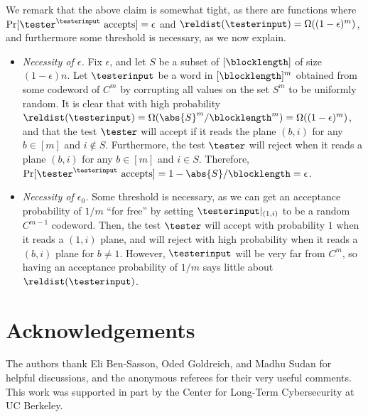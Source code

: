 \documentclass{toc}
\theoremstyle{plain}
\begin{document}
We remark that the above claim is somewhat tight, as there are functions where ${\Pr[\tester^{\testerinput} \text{ accepts}] = \epsilon}$ and $\reldist(\testerinput) = \Omega((1- \epsilon)^m)$, and furthermore some threshold is necessary, as we now explain.
\begin{itemize}

  \item \emph{Necessity of $\epsilon$.}
  Fix $\epsilon$, and let $S$ be a subset of $[\blocklength]$ of size $(1-\epsilon) n$. Let $\testerinput$ be a word in $[\blocklength]^m$ obtained from some codeword of $C^m$ by corrupting all values on the set $S^{m}$ to be uniformly random. It is clear that with high probability $\reldist(\testerinput) = \Omega(\abs{S}^m/\blocklength^m) = \Omega((1- \epsilon)^m)$, and that the test $\tester$ will accept if it reads the plane $(b, i)$ for any $b \in [m]$ and $i \notin S$. Furthermore, the test $\tester$ will reject when it reads a plane $(b,i)$ for any $b \in [m]$ and $i \in S$. Therefore, $\Pr[\tester^{\testerinput} \text{ accepts}] = 1 - \abs{S}/\blocklength = \epsilon$.

  \item \emph{Necessity of $\epsilon_0$.}
Some threshold is necessary, as we can get an acceptance probability of $1/m$ ``for free'' by setting $\testerinput |_{(1,i)}$ to be a random $C^{m-1}$ codeword. Then, the test $\tester$ will accept with probability $1$ when it reads a $(1,i)$ plane, and will reject with high probability when it reads a $(b,i)$ plane for $b \ne 1$. However, $\testerinput$ will be very far from $C^m$, so having an acceptance probability of $1/m$ says little about $\reldist(\testerinput)$.
\end{itemize}



%
%
%
\section*{Acknowledgements}

The authors thank Eli Ben-Sasson, Oded Goldreich, and Madhu Sudan for helpful discussions, and the anonymous referees for their very useful comments. This work was supported in part by the Center for Long-Term Cybersecurity at UC Berkeley.

\nocite{conf-version}


%
%
%
%

\end{document}
